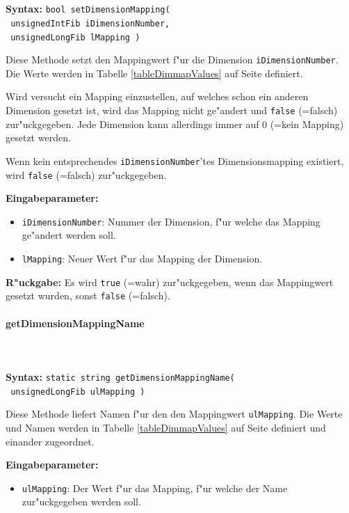\ \\\\\noindent
\textbf{Syntax:} \verb|bool setDimensionMapping(| \\\verb| unsignedIntFib iDimensionNumber,| \\\verb| unsignedLongFib lMapping )|

\bigskip\noindent
Diese Methode setzt den Mappingwert f"ur die Dimension \verb|iDimensionNumber|.
Die Werte werden in Tabelle \ref{tableDimmapValues} auf Seite \pageref{tableDimmapValues} definiert.

Wird versucht ein Mapping einzustellen, auf welches schon ein anderen Dimension gesetzt ist, wird das Mapping nicht ge"andert und \verb|false| (=falsch) zur"uckgegeben. Jede Dimension kann allerdings immer auf 0 (=kein Mapping) gesetzt werden.

Wenn kein entsprechendes \verb|iDimensionNumber|'tes Dimensionsmapping ex\-is\-tiert, wird \verb|false| (=falsch) zur"uckgegeben.

\bigskip\noindent
\textbf{Eingabeparameter:}
\begin{itemize}
 \item \verb|iDimensionNumber|: Nummer der Dimension, f"ur welche das Mapping ge"andert werden soll.
 \item \verb|lMapping|: Neuer Wert f"ur das Mapping der Dimension.
\end{itemize}

\bigskip\noindent
\textbf{R"uckgabe:} Es wird \verb|true| (=wahr) zur"uckgegeben, wenn das Mappingwert gesetzt wurden, sonst \verb|false| (=falsch).


\paragraph{getDimensionMappingName}

\ \\\\\noindent
\textbf{Syntax:} \verb|static string getDimensionMappingName(| \\\verb| unsignedLongFib ulMapping )|

\bigskip\noindent
Diese Methode liefert Namen f"ur den den Mappingwert \verb|ulMapping|.
Die Werte und Namen werden in Tabelle \ref{tableDimmapValues} auf Seite \pageref{tableDimmapValues} definiert und einander zugeordnet.


\bigskip\noindent
\textbf{Eingabeparameter:}
\begin{itemize}
 \item \verb|ulMapping|: Der Wert f"ur das Mapping, f"ur welche der Name zur"uckgegeben werden soll.
\end{itemize}


